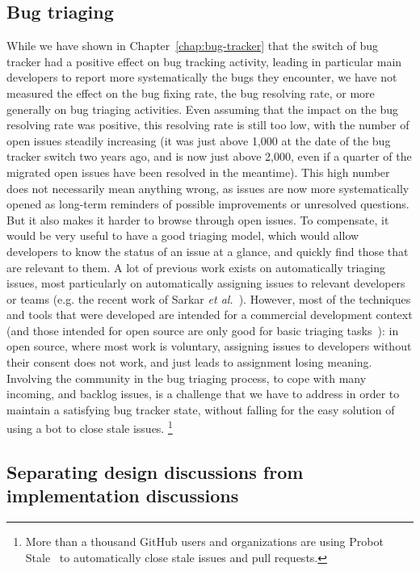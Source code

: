 \subsection{Bug triaging}

While we have shown in Chapter~\ref{chap:bug-tracker} that the switch of bug tracker had a positive effect on bug tracking activity, leading in particular main developers to report more systematically the bugs they encounter, we have not measured the effect on the bug fixing rate, the bug resolving rate, or more generally on bug triaging activities.
Even assuming that the impact on the bug resolving rate was positive, this resolving rate is still too low, with the number of open issues steadily increasing (it was just above 1,000 at the date of the bug tracker switch two years ago, and is now just above 2,000, even if a quarter of the migrated open issues have been resolved in the meantime).
This high number does not necessarily mean anything wrong, as issues are now more systematically opened as long-term reminders of possible improvements or unresolved questions.
But it also makes it harder to browse through open issues.
To compensate, it would be very useful to have a good triaging model, which would allow developers to know the status of an issue at a glance, and quickly find those that are relevant to them.
A lot of previous work exists on automatically triaging issues, most particularly on automatically assigning issues to relevant developers or teams (e.g. the recent work of Sarkar \emph{et al.}~\cite{sarkar2019triaging}).
However, most of the techniques and tools that were developed are intended for a commercial development context (and those intended for open source are only good for basic triaging tasks~\cite{kallis2019ticket}): in open source, where most work is voluntary, assigning issues to developers without their consent does not work, and just leads to assignment losing meaning.
Involving the community in the bug triaging process, to cope with many incoming, and backlog issues, is a challenge that we have to address in order to maintain a satisfying bug tracker state, without falling for the easy solution of using a bot to close stale issues.%
\footnote{
	More than a thousand GitHub users and organizations are using Probot Stale~\cite{stale} to automatically close stale issues and pull requests.
}

\subsection{Separating design discussions from implementation discussions}

